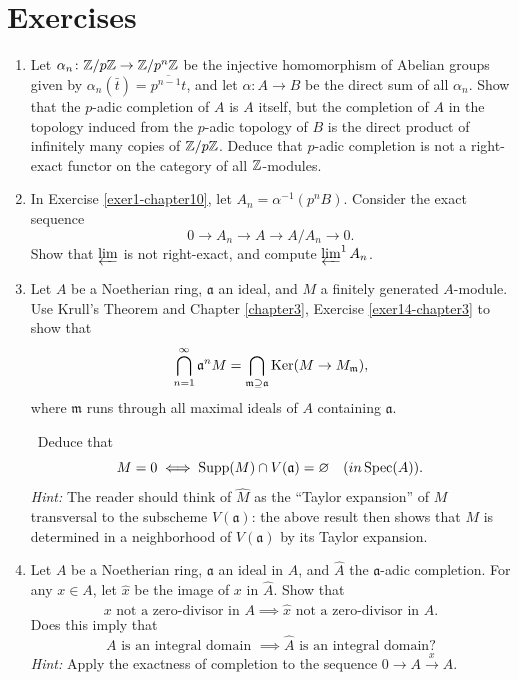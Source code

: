 \section*{Exercises}

\begin{enumerate}
    \item \label{exer1-chapter10}Let $\alpha_n \colon \mathbb{Z}/p\mathbb{Z} \to \mathbb{Z}/p^n\mathbb{Z}$ be the injective homomorphism of Abelian groups given by $\alpha_n(\bar{t}) = \overline{p^{n-1}t}$, and let $\alpha \colon A \to B$ be the direct sum of all $\alpha_n$. Show that the $p$-adic completion of $A$ is $A$ itself, but the completion of $A$ in the topology induced from the $p$-adic topology of $B$ is the direct product of infinitely many copies of $\mathbb{Z}/p\mathbb{Z}$. Deduce that $p$-adic completion is not a right-exact functor on the category of all $\mathbb{Z}$-modules.

    \item \label{exer2-chapter10}In Exercise \ref{exer1-chapter10}, let $A_n = \alpha^{-1}(p^n B)$. Consider the exact sequence
    \[
    0 \longrightarrow A_n \longrightarrow A \longrightarrow A/A_n \longrightarrow 0.
    \]
    Show that $\varprojlim$ is not right-exact, and compute $\varprojlim^1 A_n$.

    \item \label{exer3-chapter10}Let $A$ be a Noetherian ring, $\mathfrak{a}$ an ideal, and $M$ a finitely generated $A$-module. Use Krull's Theorem and Chapter \ref{chapter3}, Exercise \ref{exer14-chapter3} to show that
    \[
    \bigcap_{n=1}^\infty \mathfrak{a}^n M = \bigcap_{\mathfrak{m} \supseteq \mathfrak{a}} \operatorname{Ker}(M \to M_{\mathfrak{m}}),
    \]
    where $\mathfrak{m}$ runs through all maximal ideals of $A$ containing $\mathfrak{a}$.

    \quad\, Deduce that \[M = 0 \iff \operatorname{Supp}(M) \cap V(\mathfrak{a}) = \varnothing \quad (in \operatorname{Spec}(A)).\]
    \textit{Hint: } The reader should think of $\hat{M}$ as the ``Taylor expansion'' of $M$ transversal to the subscheme $V(\mathfrak{a})$: the above result then shows that $M$ is determined in a neighborhood of $V(\mathfrak{a})$ by its Taylor expansion.

    \item \label{exer4-chapter10}Let $A$ be a Noetherian ring, $\mathfrak{a}$ an ideal in $A$, and $\hat{A}$ the $\mathfrak{a}$-adic completion. For any $x \in A$, let $\hat{x}$ be the image of $x$ in $\hat{A}$. Show that
    \[
    x \text{ not a zero-divisor in } A \implies \hat{x} \text{ not a zero-divisor in } \hat{A}.
    \]
    Does this imply that
    \[
    A \text{ is an integral domain } \implies \hat{A} \text{ is an integral domain}?
    \]
    \textit{Hint:} Apply the exactness of completion to the sequence $0 \longrightarrow A \stackrel{x}{\longrightarrow} A$.


\end{enumerate}
